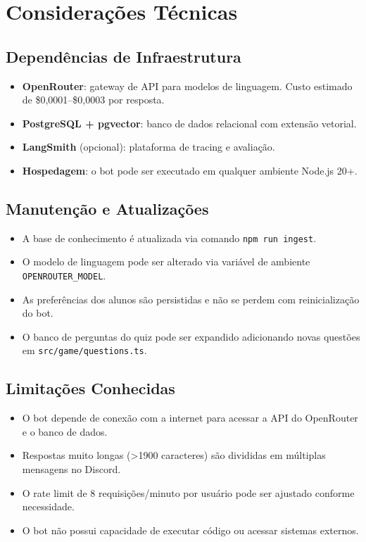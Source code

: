 \documentclass[11pt,a4paper]{article}
\begin{document}
\section{Considerações Técnicas}

\subsection{Dependências de Infraestrutura}

\begin{itemize}[leftmargin=1.5em, itemsep=0.3em]
  \item \textbf{OpenRouter}: gateway de API para modelos de linguagem. Custo estimado de \$0,0001--\$0,0003 por resposta.
  \item \textbf{PostgreSQL + pgvector}: banco de dados relacional com extensão vetorial.
  \item \textbf{LangSmith} (opcional): plataforma de tracing e avaliação.
  \item \textbf{Hospedagem}: o bot pode ser executado em qualquer ambiente Node.js 20+.
\end{itemize}

\subsection{Manutenção e Atualizações}

\begin{itemize}[leftmargin=1.5em, itemsep=0.3em]
  \item A base de conhecimento é atualizada via comando \texttt{npm run ingest}.
  \item O modelo de linguagem pode ser alterado via variável de ambiente \texttt{OPENROUTER\_MODEL}.
  \item As preferências dos alunos são persistidas e não se perdem com reinicialização do bot.
  \item O banco de perguntas do quiz pode ser expandido adicionando novas questões em \texttt{src/game/questions.ts}.
\end{itemize}

\subsection{Limitações Conhecidas}

\begin{itemize}[leftmargin=1.5em, itemsep=0.3em]
  \item O bot depende de conexão com a internet para acessar a API do OpenRouter e o banco de dados.
  \item Respostas muito longas (>1900 caracteres) são divididas em múltiplas mensagens no Discord.
  \item O rate limit de 8 requisições/minuto por usuário pode ser ajustado conforme necessidade.
  \item O bot não possui capacidade de executar código ou acessar sistemas externos.
\end{itemize}
\end{document}
